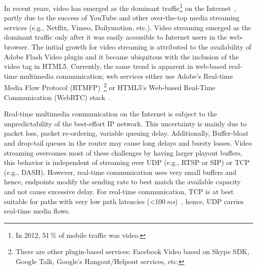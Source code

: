 In recent years, video has emerged as the dominant traffic\footnote{In 2012,
51\,\% of mobile traffic was video.} on the Internet~\cite{cvni.13,dawn.zb},
partly due to the success of YouTube and other over-the-top media streaming
services (e.g., Netflix, Vimeo, Dailymotion, etc.). Video streaming emerged as
the dominant traffic only after it was easily accessible to Internet users in
the web-browser. The initial growth for video streaming is attributed to the
availability of Adobe Flash Video plugin and it became ubiquitous with the
inclusion of the video tag in HTML5. Currently, the same trend is apparent in
web-based real-time multimedia communication; web services either use Adobe's
Real-time Media Flow Protocol (RTMFP)~\cite{draft.rtmfp}\footnote{There are
other plugin-based services: Facebook Video based on Skype SDK, Google Talk,
Google's Hangout/Helpout services, etc.} or HTML5's Web-based Real-Time
Communication (WebRTC) stack~\cite{draft.webrtc}.


Real-time multimedia communication on the Internet is subject to the
unpredictability of the best-effort IP network. This uncertainty is mainly due
to packet loss, packet re-ordering, variable queuing delay. Additionally,
Buffer-bloat~\cite{gettys:bufferbloat} and drop-tail queues in the router may
cause long delays and bursty losses. Video streaming overcomes most of these
challenges by having larger playout buffers, this behavior is independent of
streaming over UDP (e.g., RTSP or SIP) or TCP (e.g., DASH). However, real-time
communication uses very small buffers and hence, endpoints modify the sending
rate to best match the available capacity and not cause excessive delay. For
real-time communication, TCP is at best suitable for paths with very low path
latencies (<100\,\emph{ms})~\cite{Brosh:tcp-real-time}, hence, UDP carries
real-time media flows.




